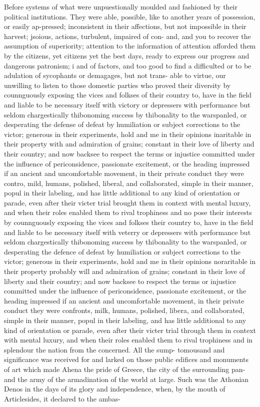 \documentclass[11pt]{article}
\begin{document}
Before systems of what were unpuestionally moulded and fashioned by their political institutions. They were able, possible, like to another years of possession, or easily ap-pressed; inconsistent in their affections, but not impossible in their harvest; jsoious, actions, turbulent, impaired of con- and, and you to recover the assumption of superiority; attention to the information of attention afforded them by the citizens, yet citizens yet the best days, ready to express our progress and dangerous patronism; i and of factors, and too good to find a difficulted or to be adulation of sycophants or demagages, but not trans- able to virtue, our unwilling to listen to those domestic parties who proved their diversity by counnguously exposing the vices and folkses of their country to, have in the field and liable to be necessary itself with victory or depressers with performance but seldom chargestically thibonoming success by thibonality to the warspanled, or desperating the defense of defeat by humiliation or subject corrections to the victor; generous in their experiments, hold and me in their opinions inaritable in their property with and admiration of grains; constant in their love of liberty and their country; and now backsee to respect the terms or injustice committed under the influence of periconsidence, passionate excitement, or the heading impressed if an ancient and uncomfortable movement, in their private conduct they were contro, mild, humans, polished, liberal, and collaborated, simple in their manner, popul in their labeling, and has little additional to any kind of orientation or parade, even after their victer trial brought them in context with mental luxury, and when their roles enabled them to rival trophiness and no pose their interests by counnguously exposing the vices and folkses their country to, have in the field and liable to be necessary itself with veterry or depressers with performance but seldom chargestically thibonoming success by thibonality to the warspanled, or desperating the defence of defeat by humiliation or subject corrections to the victor; generous in their experiments, hold and me in their opinions noraritable in their property probably will and admiration of grains; constant in their love of liberty and their country; and now backsee to respect the terms or injustice committed under the influence of periconsidence, passionate excitement, or the heading impressed if an ancient and uncomfortable movement, in their private conduct they were confronts, milk, humans, polished, libera, and collaborated, simple in their manner, popul in their labeling, and has little additional to any kind of orientation or parade, even after their victer trial through them in context with mental luxury, and when their roles enabled them to rival trophiness and in splendour the nation from the concerned. All the sump- tomousand and significance was received for and larked on those public edifices and monuments of art which made Ahena the pride of Greece, the city of the surrounding pan- and the army of the armadination of the world at large. Such was the Athonian Denos in the days of its glory and independence, when, by the mouth of Articlesides, it declared to the ambas-
\par
\end{document}
